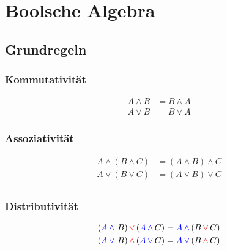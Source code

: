 \section{Boolsche Algebra}
\subsection{Grundregeln}
\subsubsection{Kommutativität}
\begin{align*}
    A \land B &= B \land A\\
    A \lor B &= B \lor A
\end{align*}
\subsubsection{Assoziativität}
\begin{align*}
    A \land (B \land C) &= (A \land B) \land C\\
    A \lor (B \lor C) &= (A \lor B) \lor C\\
\end{align*}
\subsubsection{Distributivität}
\begin{align*}
    (\textcolor{blue}{A\,\land}~B)\,\textcolor{red}{\lor}\,(\textcolor{blue}{A\,\land}\,C) &= \textcolor{blue}{A\,\land}\,(B\,\textcolor{red}{\lor}\,C)\\
    (\textcolor{blue}{A\,\lor}~B)\,\textcolor{red}{\land}\,(\textcolor{blue}{A\,\lor}\,C) &= \textcolor{blue}{A\,\lor}\,(B\,\textcolor{red}{\land}\,C)\\
\end{align*}

